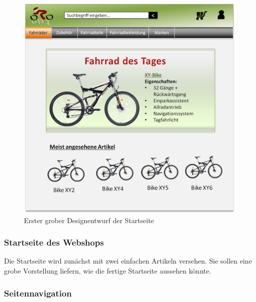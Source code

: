 \begin{figure}[H]
\begin{center}
\includegraphics[width=150mm]{Bilder/Abbildung2-GroberDesignEntwurfDesWebshops.png}
\end{center}
\caption{Erster grober Designentwurf der Startseite}
\end{figure}

\subsubsection{Startseite des Webshops}

Die Startseite wird zunächst mit zwei einfachen Artikeln versehen. Sie sollen eine grobe Vorstellung liefern, wie die fertige Startseite aussehen könnte.

\subsubsection{Seitennavigation}

